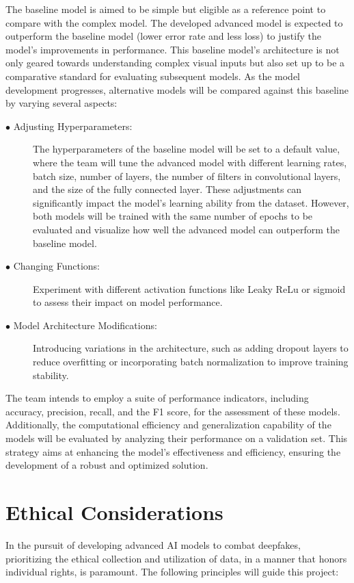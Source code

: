 \documentclass{article} %
\begin{document}
The baseline model is aimed to be simple but eligible as a reference point to compare with the complex model. The developed advanced model is expected to outperform the baseline model (lower error rate and less loss) to justify the model's improvements in performance. This baseline model's architecture is not only geared towards understanding complex visual inputs but also set up to be a comparative standard for evaluating subsequent models. As the model development progresses, alternative models will be compared against this baseline by varying several aspects:
\begin{description}
  \item[$\bullet$ Adjusting Hyperparameters:] The hyperparameters of the baseline model will be set to a default value, where the team will tune the advanced model with different learning rates, batch size, number of layers, the number of filters in convolutional layers, and the size of the fully connected layer. These adjustments can significantly impact the model's learning ability from the dataset. However, both models will be trained with the same number of epochs to be evaluated and visualize how well the advanced model can outperform the baseline model.
  \item[$\bullet$ Changing Functions:] Experiment with different activation functions like Leaky ReLu or sigmoid to assess their impact on model performance.
  \item[$\bullet$ Model Architecture Modifications:] Introducing variations in the architecture, such as adding dropout layers to reduce overfitting or incorporating batch normalization to improve training stability.
\end{description}

The team intends to employ a suite of performance indicators, including accuracy, precision, recall, and the F1 score, for the assessment of these models. Additionally, the computational efficiency and generalization capability of the models will be evaluated by analyzing their performance on a validation set. This strategy aims at enhancing the model's effectiveness and efficiency, ensuring the development of a robust and optimized solution.

\section{Ethical Considerations}

In the pursuit of developing advanced AI models to combat deepfakes, prioritizing the ethical collection and utilization of data, in a manner that honors individual rights, is paramount. The following principles will guide this project:
\end{document}
